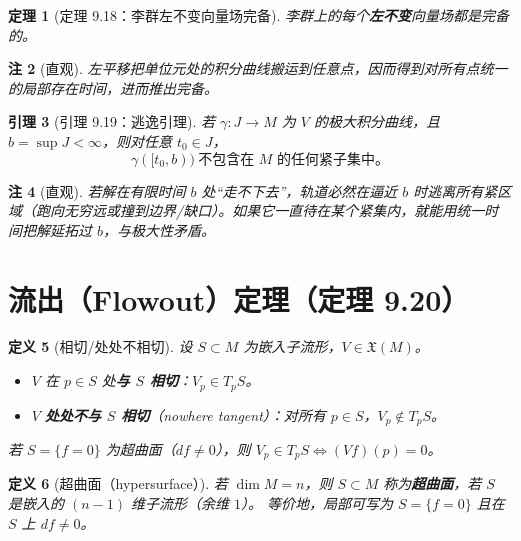 \documentclass[11pt]{article}
\newtheorem{definition}{定义}[section]
\newtheorem{theorem}[definition]{定理}
\newtheorem{lemma}[definition]{引理}
\newtheorem{remark}[definition]{注}
\newcommand{\X}{\mathfrak{X}}
\begin{document}
\begin{theorem}[定理 9.18：李群左不变向量场完备]
李群上的每个\textbf{左不变}向量场都是完备的。
\end{theorem}

\begin{remark}[直观]
左平移把单位元处的积分曲线搬运到任意点，因而得到对所有点统一的局部存在时间，进而推出完备。
\end{remark}

\begin{lemma}[引理 9.19：逃逸引理]
若 $\gamma:J\to M$ 为 $V$ 的极大积分曲线，且 $b=\sup J<\infty$，则对任意 $t_0\in J$，
\[
\gamma([t_0,b))\ \text{不包含在 }M\text{ 的任何紧子集中。}
\]
\end{lemma}

\begin{remark}[直观]
若解在有限时间 $b$ 处“走不下去”，轨道必然在逼近 $b$ 时逃离所有紧区域（跑向无穷远或撞到边界/缺口）。如果它一直待在某个紧集内，就能用统一时间把解延拓过 $b$，与极大性矛盾。
\end{remark}

\section{流出（Flowout）定理（定理 9.20）}

\begin{definition}[相切/处处不相切]
设 $S\subset M$ 为嵌入子流形，$V\in\X(M)$。
\begin{itemize}
\item $V$ 在 $p\in S$ 处\textbf{与 $S$ 相切}：$V_p\in T_pS$。
\item $V$ \textbf{处处不与 $S$ 相切}（nowhere tangent）：对所有 $p\in S$，$V_p\notin T_pS$。
\end{itemize}
若 $S=\{f=0\}$ 为超曲面（$df\neq 0$），则 $V_p\in T_pS \iff (Vf)(p)=0$。
\end{definition}

\begin{definition}[超曲面（hypersurface）]
若 $\dim M=n$，则 $S\subset M$ 称为\textbf{超曲面}，若 $S$ 是嵌入的 $(n-1)$ 维子流形（余维 $1$）。
等价地，局部可写为 $S=\{f=0\}$ 且在 $S$ 上 $df\neq 0$。
\end{definition}
\end{document}
